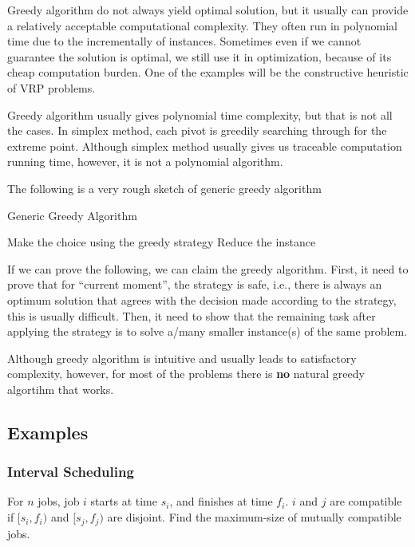 				Greedy algorithm do not always yield optimal solution, but it usually can provide a relatively acceptable computational complexity. They often run in polynomial time due to the incrementally of instances. Sometimes even if we cannot guarantee the solution is optimal, we still use it in optimization, because of its cheap computation burden. One of the examples will be the constructive heuristic of VRP problems.

				Greedy algorithm usually gives polynomial time complexity, but that is not all the cases. In simplex method, each pivot is greedily searching through for the extreme point. Although simplex method usually gives us traceable computation running time, however, it is not a polynomial algorithm.

				The following is a very rough sketch of generic greedy algorithm
				\begin{algorithm}[!ht]
					\caption{Generic Greedy Algorithm}
					\begin{algorithmic}[1]
							\State Make the choice using the greedy strategy
							\State Reduce the instance
						\EndWhile
					\end{algorithmic}
				\end{algorithm}

				If we can prove the following, we can claim the greedy algorithm. First, it need to prove that for ``current moment'', the strategy is safe, i.e., there is always an optimum solution that agrees with the decision made according to the strategy, this is usually difficult. Then, it need to show that the remaining task after applying the strategy is to solve a/many smaller instance(s) of the same problem.

				Although greedy algorithm is intuitive and usually leads to satisfactory complexity, however, for most of the problems there is \textbf{no} natural greedy algortihm that works.
			\subsection{Examples}
				\subsubsection{Interval Scheduling}
					For $n$ jobs, job $i$ starts at time $s_i$, and finishes at time $f_i$. $i$ and $j$ are compatible if $[s_i, f_i)$ and $[s_j, f_j)$ are disjoint. Find the maximum-size of mutually compatible jobs.

